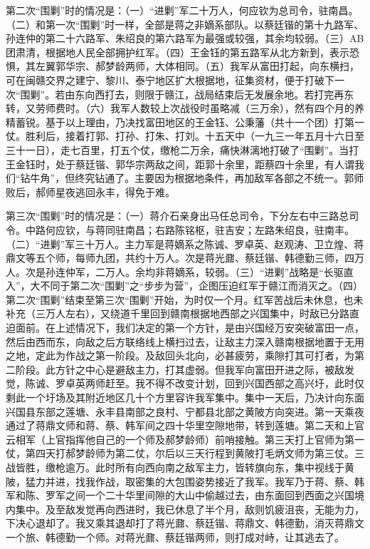 第二次“围剿”时的情况是：（一）“进剿”军二十万人，何应钦为总司令，驻南昌。（二）和第一次“围剿”时一样，全部是蒋之非嫡系部队。以蔡廷锴的第十九路军、孙连仲的第二十六路军、朱绍良的第六路军为最强或较强，其余均较弱。（三）AB团肃清，根据地人民全部拥护红军。（四）王金钰的第五路军从北方新到，表示恐惧，其左翼郭华宗、郝梦龄两师，大体相同。（五）我军从富田打起，向东横扫，可在闽赣交界之建宁、黎川、泰宁地区扩大根据地，征集资材，便于打破下一次“围剿”。若由东向西打去，则限于赣江，战局结束后无发展余地。若打完再东转，又劳师费时。（六）我军人数较上次战役时虽略减（三万余），然有四个月的养精蓄锐。基于以上理由，乃决找富田地区的王金钰、公秉藩（共十一个团）打第一仗。胜利后，接着打郭、打孙、打朱、打刘。十五天中（一九三一年五月十六日至三十一日），走七百里，打五个仗，缴枪二万余，痛快淋漓地打破了“围剿”。当打王金钰时，处于蔡廷锴、郭华宗两敌之间，距郭十余里，距蔡四十余里，有人谓我们“钻牛角”，但终究钻通了。主要因为根据地条件，再加敌军各部之不统一。郭师败后，郝师星夜逃回永丰，得免于难。

第三次“围剿”时的情况是：（一）蒋介石亲身出马任总司令，下分左右中三路总司令。中路何应钦，与蒋同驻南昌；右路陈铭枢，驻吉安；左路朱绍良，驻南丰。（二）“进剿”军三十万人。主力军是蒋嫡系之陈诚、罗卓英、赵观涛、卫立煌、蒋鼎文等五个师，每师九团，共约十万人。次是蒋光鼐、蔡廷锴、韩德勤三师，四万人。次是孙连仲军，二万人。余均非蒋嫡系，较弱。（三）“进剿”战略是“长驱直入”，大不同于第二次“围剿”之“步步为营”，企图压迫红军于赣江而消灭之。（四）第二次“围剿”结束至第三次“围剿”开始，为时仅一个月。红军苦战后未休息，也未补充（三万人左右），又绕道千里回到赣南根据地西部之兴国集中，时敌已分路直迫面前。在上述情况下，我们决定的第一个方针，是由兴国经万安突破富田一点，然后由西而东，向敌之后方联络线上横扫过去，让敌主力深入赣南根据地置于无用之地，定此为作战之第一阶段。及敌回头北向，必甚疲劳，乘隙打其可打者，为第二阶段。此方针之中心是避敌主力，打其虚弱。但我军向富田开进之际，被敌发觉，陈诚、罗卓英两师赶至。我不得不改变计划，回到兴国西部之高兴圩，此时仅剩此一个圩场及其附近地区几十个方里容许我军集中。集中一天后，乃决计向东面兴国县东部之莲塘、永丰县南部之良村、宁都县北部之黄陂方向突进。第一天乘夜通过了蒋鼎文师和蒋、蔡、韩军间之四十华里空隙地带，转到莲塘。第二天和上官云相军（上官指挥他自己的一个师及郝梦龄师）前哨接触。第三天打上官师为第一仗，第四天打郝梦龄师为第二仗，尔后以三天行程到黄陂打毛炳文师为第三仗。三战皆胜，缴枪逾万。此时所有向西向南之敌军主力，皆转旗向东，集中视线于黄陂，猛力并进，找我作战，取密集的大包围姿势接近了我军。我军乃于蒋、蔡、韩军和陈、罗军之间一个二十华里间隙的大山中偷越过去，由东面回到西面之兴国境内集中。及至敌发觉再向西进时，我已休息了半个月，敌则饥疲沮丧，无能为力，下决心退却了。我又乘其退却打了蒋光鼐、蔡廷锴、蒋鼎文、韩德勤，消灭蒋鼎文一个旅、韩德勤一个师。对蒋光鼐、蔡廷锴两师，则打成对峙，让其逃去了。

